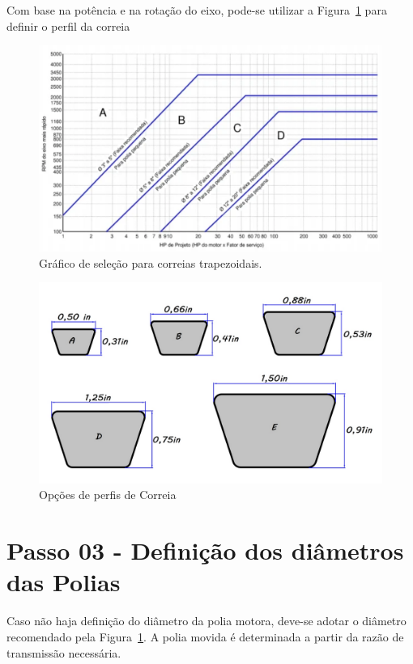 Com base na potência e na rotação do eixo, pode-se utilizar a Figura~\ref{graf_perfis} para definir o perfil da correia

\begin{figure}[h]
	\centering
	\caption{Gráfico de seleção para correias trapezoidais.}
    \label{graf_perfis}
	\includegraphics[scale=0.42]{Imagens/graf_perfis.png}
\end{figure}

\begin{figure}[h]
	\centering
	\caption{Opções de perfis de Correia}
    \label{perfis_correia}
	\includegraphics[scale=0.45]{Imagens/perfis_correia.png}
\end{figure}

\section{Passo 03 - Definição dos diâmetros das Polias}

Caso não haja definição do diâmetro da polia motora, deve-se adotar o diâmetro recomendado pela Figura~\ref{graf_perfis}. A polia movida é determinada a partir da razão de transmissão necessária.

